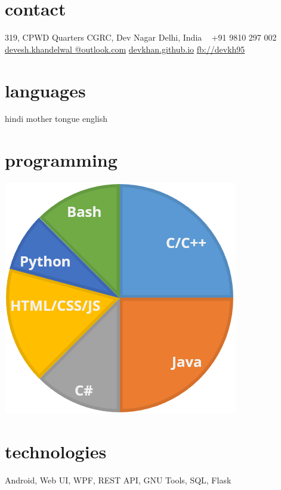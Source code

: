 \documentclass[]{devkhan-cv} %
\begin{document}


\begin{aside} %
\section{contact}
319, CPWD Quarters
CGRC, Dev Nagar
Delhi, India
~
+91 9810 297 002
~
\href{mailto:devesh.khandelwal@outlook.com}{devesh.khandelwal
@outlook.com}
\href{http://devkhan.github.io}{devkhan.github.io}
\href{http://fb.com/devkh95}{fb://devkh95}
\section{languages}
hindi mother tongue
english
\section{programming}
\includegraphics[scale=0.35]{img/programming.png}
\section{technologies}
Android, Web UI, WPF, REST API, GNU Tools, SQL, Flask
\end{aside}
\end{document}
